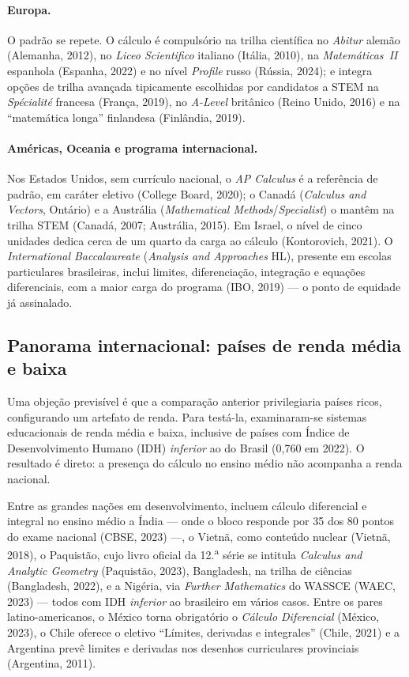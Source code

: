 \documentclass[12pt,a4paper,oneside]{article}
\begin{document}
\paragraph{Europa.} O padrão se repete. O cálculo é compulsório na trilha
científica no \emph{Abitur} alemão (Alemanha, 2012), no \emph{Liceo
Scientifico} italiano (Itália, 2010), na \emph{Matemáticas~II} espanhola
(Espanha, 2022) e no nível \emph{Profile} russo (Rússia, 2024); e integra
opções de trilha avançada tipicamente escolhidas por candidatos a STEM na
\emph{Spécialité} francesa (França, 2019), no \emph{A-Level} britânico
(Reino Unido, 2016) e na ``matemática longa'' finlandesa (Finlândia, 2019).

\paragraph{Américas, Oceania e programa internacional.} Nos Estados
Unidos, sem currículo nacional, o \emph{AP Calculus} é a referência de
padrão, em caráter eletivo (College Board, 2020); o Canadá
(\emph{Calculus and Vectors}, Ontário) e a Austrália (\emph{Mathematical
Methods}/\emph{Specialist}) o mantêm na trilha STEM (Canadá, 2007;
Austrália, 2015). Em Israel, o nível de cinco unidades dedica cerca de um
quarto da carga ao cálculo (Kontorovich, 2021). O \emph{International
Baccalaureate} (\emph{Analysis and Approaches} HL), presente em escolas
particulares brasileiras, inclui limites, diferenciação, integração e
equações diferenciais, com a maior carga do programa (IBO, 2019) --- o
ponto de equidade já assinalado.

\subsection{Panorama internacional: países de renda média e baixa}
\label{sec:desenvolvimento}

Uma objeção previsível é que a comparação anterior privilegiaria países
ricos, configurando um artefato de renda. Para testá-la, examinaram-se
sistemas educacionais de renda média e baixa, inclusive de países com
Índice de Desenvolvimento Humano (IDH) \emph{inferior} ao do Brasil
(0,760 em 2022). O resultado é direto: a presença do cálculo no ensino
médio não acompanha a renda nacional.

Entre as grandes nações em desenvolvimento, incluem cálculo diferencial e
integral no ensino médio a Índia --- onde o bloco responde por 35 dos 80
pontos do exame nacional (CBSE, 2023) ---, o Vietnã, como conteúdo nuclear
(Vietnã, 2018), o Paquistão, cujo livro oficial da 12.\textsuperscript{a}
série se intitula \emph{Calculus and Analytic Geometry} (Paquistão, 2023),
Bangladesh, na trilha de ciências (Bangladesh, 2022), e a Nigéria, via
\emph{Further Mathematics} do WASSCE (WAEC, 2023) --- todos com IDH
\emph{inferior} ao brasileiro em vários casos. Entre os pares
latino-americanos, o México torna obrigatório o \emph{Cálculo Diferencial}
(México, 2023), o Chile oferece o eletivo ``Límites, derivadas e
integrales'' (Chile, 2021) e a Argentina prevê limites e derivadas nos
desenhos curriculares provinciais (Argentina, 2011).
\end{document}
